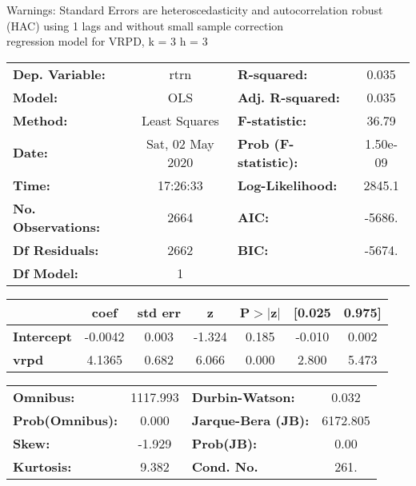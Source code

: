Warnings: \newline
 [1] Standard Errors are heteroscedasticity and autocorrelation robust (HAC) using 1 lags and without small sample correction\\ 

regression model for VRPD, k = 3 h = 3\begin{center}
\begin{tabular}{lclc}
\toprule
\textbf{Dep. Variable:}    &       rtrn       & \textbf{  R-squared:         } &     0.035   \\
\textbf{Model:}            &       OLS        & \textbf{  Adj. R-squared:    } &     0.035   \\
\textbf{Method:}           &  Least Squares   & \textbf{  F-statistic:       } &     36.79   \\
\textbf{Date:}             & Sat, 02 May 2020 & \textbf{  Prob (F-statistic):} &  1.50e-09   \\
\textbf{Time:}             &     17:26:33     & \textbf{  Log-Likelihood:    } &    2845.1   \\
\textbf{No. Observations:} &        2664      & \textbf{  AIC:               } &    -5686.   \\
\textbf{Df Residuals:}     &        2662      & \textbf{  BIC:               } &    -5674.   \\
\textbf{Df Model:}         &           1      & \textbf{                     } &             \\
\bottomrule
\end{tabular}
\begin{tabular}{lcccccc}
                   & \textbf{coef} & \textbf{std err} & \textbf{z} & \textbf{P$> |$z$|$} & \textbf{[0.025} & \textbf{0.975]}  \\
\midrule
\textbf{Intercept} &      -0.0042  &        0.003     &    -1.324  &         0.185        &       -0.010    &        0.002     \\
\textbf{vrpd}      &       4.1365  &        0.682     &     6.066  &         0.000        &        2.800    &        5.473     \\
\bottomrule
\end{tabular}
\begin{tabular}{lclc}
\textbf{Omnibus:}       & 1117.993 & \textbf{  Durbin-Watson:     } &    0.032  \\
\textbf{Prob(Omnibus):} &   0.000  & \textbf{  Jarque-Bera (JB):  } & 6172.805  \\
\textbf{Skew:}          &  -1.929  & \textbf{  Prob(JB):          } &     0.00  \\
\textbf{Kurtosis:}      &   9.382  & \textbf{  Cond. No.          } &     261.  \\
\bottomrule
\end{tabular}
\end{center}

